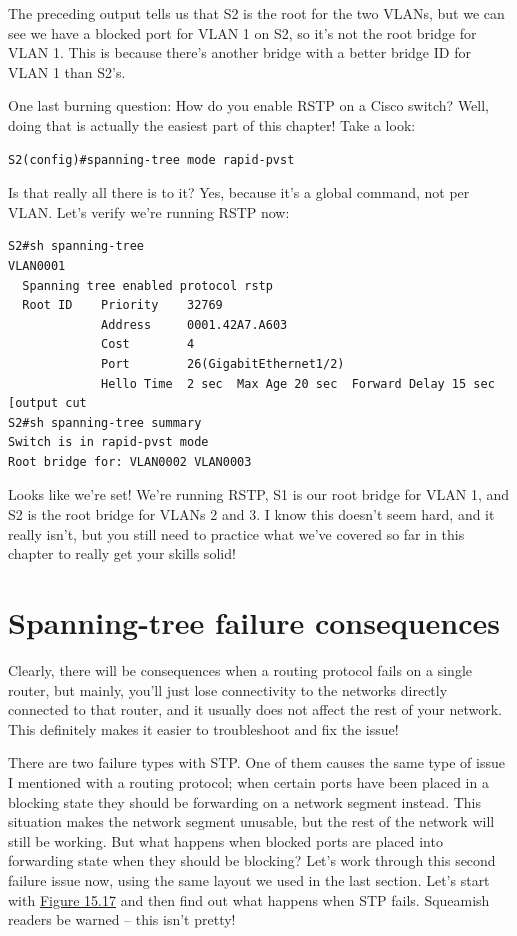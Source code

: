 \documentclass[b5paper,11pt]{memoir}
\begin{document}
The preceding output tells us that S2 is the root for the two VLANs, but
we can see we have a blocked port for VLAN 1 on S2, so it's not the root
bridge for VLAN 1. This is because there's another bridge with a better
bridge ID for VLAN 1 than S2's.

One last burning question: How do you enable RSTP on a Cisco switch?
Well, doing that is actually the easiest part of this chapter! Take a
look:

\begin{verbatim}
S2(config)#spanning-tree mode rapid-pvst
\end{verbatim}

Is that really all there is to it? Yes, because it's a global command,
not per VLAN. Let's verify we're running RSTP now:

\begin{verbatim}
S2#sh spanning-tree
VLAN0001
  Spanning tree enabled protocol rstp
  Root ID    Priority    32769
             Address     0001.42A7.A603
             Cost        4
             Port        26(GigabitEthernet1/2)
             Hello Time  2 sec  Max Age 20 sec  Forward Delay 15 sec
[output cut
S2#sh spanning-tree summary
Switch is in rapid-pvst mode
Root bridge for: VLAN0002 VLAN0003
\end{verbatim}

Looks like we're set! We're running RSTP, S1 is our root bridge for VLAN
1, and S2 is the root bridge for VLANs 2 and 3. I know this doesn't seem
hard, and it really isn't, but you still need to practice what we've
covered so far in this chapter to really get your skills solid!

\section{Spanning-tree failure consequences}

Clearly, there will be consequences when a routing protocol fails on a
single router, but mainly, you'll just lose connectivity to the networks
directly connected to that router, and it usually does not affect the
rest of your network. This definitely makes it easier to troubleshoot
and fix the issue!

There are two failure types with STP. One of them causes the same type
of issue I mentioned with a routing protocol; when certain ports have
been placed in a blocking state they should be forwarding on a network
segment instead. This situation makes the network
segment unusable, but
the rest of the network will still be working. But what happens when
blocked ports are placed into forwarding state when they should be
blocking? Let's work through this second failure issue now, using the
same layout we used in the last section. Let's start with
\protect\hyperlink{c15.xhtmlux5cux23figure15-17}{Figure 15.17} and then
find out what happens when STP fails. Squeamish readers be warned -- this
isn't pretty!
\end{document}
